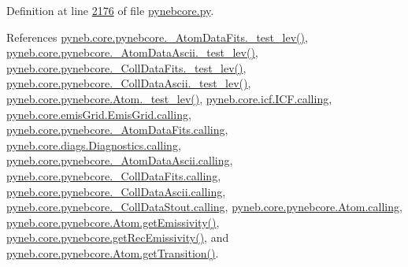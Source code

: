 Definition at line \hyperlink{pynebcore_8py_source_l02176}{2176} of file \hyperlink{pynebcore_8py_source}{pynebcore.\-py}.



References \hyperlink{pynebcore_8py_source_l00178}{pyneb.\-core.\-pynebcore.\-\_\-\-Atom\-Data\-Fits.\-\_\-test\-\_\-lev()}, \hyperlink{pynebcore_8py_source_l00447}{pyneb.\-core.\-pynebcore.\-\_\-\-Atom\-Data\-Ascii.\-\_\-test\-\_\-lev()}, \hyperlink{pynebcore_8py_source_l00677}{pyneb.\-core.\-pynebcore.\-\_\-\-Coll\-Data\-Fits.\-\_\-test\-\_\-lev()}, \hyperlink{pynebcore_8py_source_l01045}{pyneb.\-core.\-pynebcore.\-\_\-\-Coll\-Data\-Ascii.\-\_\-test\-\_\-lev()}, \hyperlink{pynebcore_8py_source_l01525}{pyneb.\-core.\-pynebcore.\-Atom.\-\_\-test\-\_\-lev()}, \hyperlink{icf_8py_source_l00016}{pyneb.\-core.\-icf.\-I\-C\-F.\-calling}, \hyperlink{emis_grid_8py_source_l00044}{pyneb.\-core.\-emis\-Grid.\-Emis\-Grid.\-calling}, \hyperlink{pynebcore_8py_source_l00097}{pyneb.\-core.\-pynebcore.\-\_\-\-Atom\-Data\-Fits.\-calling}, \hyperlink{diags_8py_source_l00169}{pyneb.\-core.\-diags.\-Diagnostics.\-calling}, \hyperlink{pynebcore_8py_source_l00318}{pyneb.\-core.\-pynebcore.\-\_\-\-Atom\-Data\-Ascii.\-calling}, \hyperlink{pynebcore_8py_source_l00585}{pyneb.\-core.\-pynebcore.\-\_\-\-Coll\-Data\-Fits.\-calling}, \hyperlink{pynebcore_8py_source_l00936}{pyneb.\-core.\-pynebcore.\-\_\-\-Coll\-Data\-Ascii.\-calling}, \hyperlink{pynebcore_8py_source_l01156}{pyneb.\-core.\-pynebcore.\-\_\-\-Coll\-Data\-Stout.\-calling}, \hyperlink{pynebcore_8py_source_l01229}{pyneb.\-core.\-pynebcore.\-Atom.\-calling}, \hyperlink{pynebcore_8py_source_l01782}{pyneb.\-core.\-pynebcore.\-Atom.\-get\-Emissivity()}, \hyperlink{pynebcore_8py_source_l03158}{pyneb.\-core.\-pynebcore.\-get\-Rec\-Emissivity()}, and \hyperlink{pynebcore_8py_source_l01472}{pyneb.\-core.\-pynebcore.\-Atom.\-get\-Transition()}.


